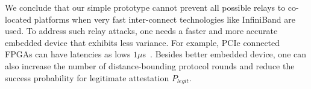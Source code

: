 We conclude that our simple prototype cannot prevent all possible relays to co-located platforms when very fast inter-connect technologies like InfiniBand are used. To address such relay attacks, one needs a faster and more accurate embedded device that exhibits less variance. For example, PCIe connected FPGAs can have latencies as lows $1 \mu $s~\cite{algoLogic}. Besides better embedded device, one can also increase the number of distance-bounding protocol rounds and reduce the success probability for legitimate attestation $P_{legit}$.


